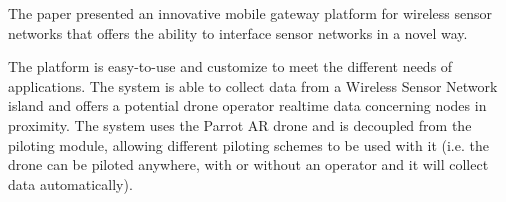 The paper presented an innovative mobile gateway platform for wireless sensor networks
that offers the ability to interface sensor networks in a novel way.

The platform is easy-to-use and customize to meet the different needs of applications. The system is able to collect data from a Wireless Sensor Network island and offers a potential drone operator realtime data concerning nodes in proximity. The system uses the Parrot AR drone and is decoupled from the piloting module, allowing different piloting schemes to be used with it (i.e. the drone can be piloted anywhere, with or without an operator and it will collect data automatically).


